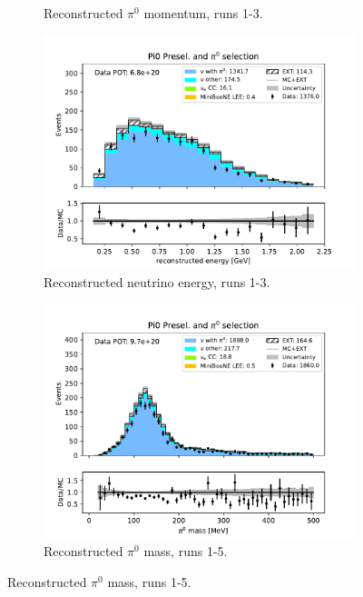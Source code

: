 \begin{figure}[H]
\begin{subfigure}{0.33\linewidth}
        \caption{Reconstructed $\pi^0$ momentum, runs 1-3.}
    \end{subfigure}%
    \begin{subfigure}{0.33\linewidth}
        \includegraphics[width=\linewidth]{technote/Sidebands/Figures/TwoShowerSideband/two_shr_sideband_reco_e_run123_PI0_PI0.pdf}
        \caption{Reconstructed neutrino energy, runs 1-3.}
    \end{subfigure}
    \begin{subfigure}{0.33\linewidth}
        \includegraphics[width=\linewidth]{technote/Sidebands/Figures/TwoShowerSideband/two_shr_sideband_pi0_mass_Y_corr_run1234b4c4d_PI0_PI0.pdf}
        \caption{Reconstructed $\pi^0$ mass, runs 1-5.}
    \end{subfigure}%

\end{figure}

